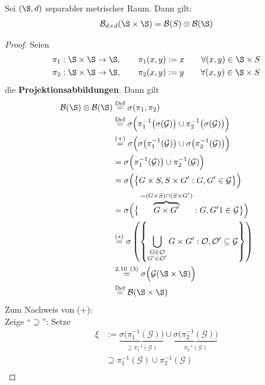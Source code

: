 \begin{satz}\label{satz3.3} %
Sei $(\S,d)$ separabler metrischer Raum. Dann gilt:
\begin{align*}
\B_{d\times d}(\S\times\S)=\B(S)\otimes\B(\S)
\end{align*}
\end{satz}
\begin{proof}
Seien
\begin{align*}
&\pi_1:\S\times\S\to\S,\qquad \pi_1(x,y):=x\qquad\forall(x,y)\in\S\times S\\
&\pi_2:\S\times\S\to\S,\qquad \pi_2(x,y):=y\qquad\forall(x,y)\in\S\times S
\end{align*}
die \textbf{Projektionsabbildungen}. Dann gilt
\begin{align*}
\B(\S)\otimes\B(\S) 
&\stackeq{\text{Def}}
\sigma(\pi_1,\pi_2)\\
&\stackeq{\text{Def}}
\sigma\Big(\pi_1^{-1}\big(\sigma(\mathcal{G})\big)\cup\pi_2^{-1}\big(\sigma(\mathcal{G})\big)\Big)\\
&\stackeq{(+)}
\sigma\Big(\sigma\big(\pi_1^{-1}(\mathcal{G})\big)\cup\sigma\big(\pi_2^{-1}(\mathcal{G})\big)\Big)\\
&=
\sigma\Big(\pi_1^{-1}(\mathcal{G})\big)\cup\pi_2^{-1}(\mathcal{G})\Big)\\
&=\sigma\Big(\big\lbrace G\times S,S\times G':G,G'\in\mathcal{G}\big\rbrace\Big)\\
&=
\sigma\Big(\big\lbrace \overbrace{G\times G'}^{=(G\times S)\cap(S\times G')}:G,G'1\in\mathcal{G}\big\rbrace\Big)\\
&\stackeq{\text{($\ast$)}}
\sigma\left(\left\lbrace\bigcup\limits_{\begin{subarray}{c}G\in\mathcal{O}\\G'\in\mathcal{O}'\end{subarray}}G\times G':\mathcal{O},\mathcal{O}'\subseteq\mathcal{G}\right\rbrace\right)\\
&\stackeq{2.10~(3)}
\sigma\Big(\mathcal{G}(\S\times\S)\Big)\\
&\stackeq{\text{Def}}
\B(\S\times\S)
\end{align*}
Zum Nachweis von (+):\\
Zeige ``$\supseteq$'': Setze
\begin{align*}
\xi&:=
\underbrace{\sigma\big(\pi_1^{-1}(\mathcal{G})\big)}_{\supseteq \pi_1^{-1}(\mathcal{G})}\cup\underbrace{\sigma\big(\pi_2^{-1}(\mathcal{G})\big)}_{\pi_2^{-1}(\mathcal{G})}\\
&\supseteq
\pi_1^{-1}(\mathcal{G})\cup\pi_2^{-1}(\mathcal{G})\\

\end{align*}
\end{proof}
